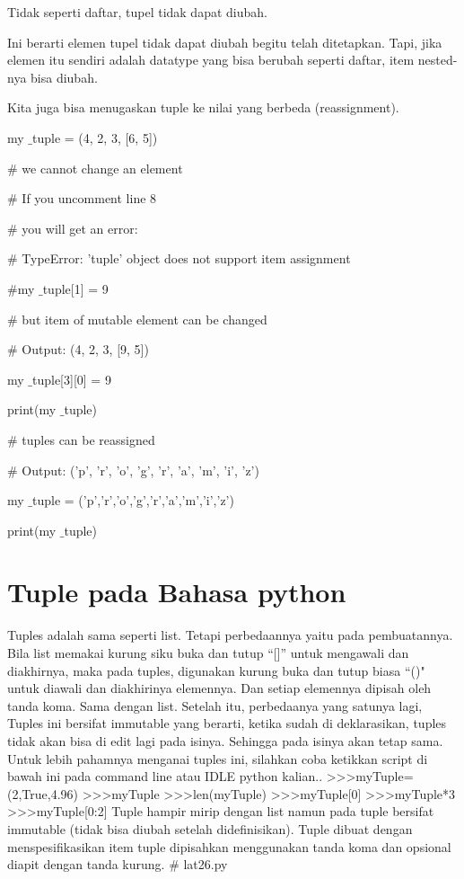 Tidak seperti daftar, tupel tidak dapat diubah. \par
\vspace{12pt}
Ini berarti elemen tupel tidak dapat diubah begitu telah ditetapkan. Tapi, jika elemen itu sendiri adalah datatype yang bisa berubah seperti daftar, item nested-nya bisa diubah. \par
\vspace{12pt}
Kita juga bisa menugaskan tuple ke nilai yang berbeda (reassignment). \par
\vspace{12pt}
my $  \_  $tuple = (4, 2, 3, [6, 5]) \par
\vspace{12pt}
 $  \#  $ we cannot change an element \par
 $  \#  $ If you uncomment line 8 \par
 $  \#  $ you will get an error: \par
 $  \#  $ TypeError: 'tuple' object does not support item assignment \par
\vspace{12pt}
 $  \#  $my $  \_  $tuple[1] = 9 \par
\vspace{12pt}
 $  \#  $ but item of mutable element can be changed \par
 $  \#  $ Output: (4, 2, 3, [9, 5]) \par
my $  \_  $tuple[3][0] = 9 \par
print(my $  \_  $tuple) \par
\vspace{12pt}
 $  \#  $ tuples can be reassigned \par
 $  \#  $ Output: ('p', 'r', 'o', 'g', 'r', 'a', 'm', 'i', 'z') \par
my $  \_  $tuple = ('p','r','o','g','r','a','m','i','z') \par
print(my $  \_  $tuple) \par
\section {Tuple pada Bahasa python}

Tuples adalah sama seperti list. Tetapi perbedaannya yaitu pada pembuatannya. Bila list memakai kurung siku buka dan tutup “[]” untuk mengawali dan diakhirnya, maka pada tuples, digunakan kurung buka dan tutup biasa “()" untuk diawali dan diakhirinya elemennya. Dan setiap elemennya dipisah oleh tanda koma. Sama dengan list. Setelah itu, perbedaanya yang satunya lagi, Tuples ini bersifat immutable yang berarti, ketika sudah di deklarasikan, tuples tidak akan bisa di edit lagi pada isinya. Sehingga pada isinya akan tetap sama. Untuk lebih pahamnya menganai tuples ini, silahkan coba ketikkan script di bawah ini pada command line atau IDLE python kalian..
>>>myTuple=(2,True,4.96) 
>>>myTuple 
>>>len(myTuple) 
>>>myTuple[0] 
>>>myTuple*3
 >>>myTuple[0:2]
Tuple hampir mirip dengan list namun pada tuple bersifat immutable (tidak bisa diubah setelah didefinisikan).
Tuple dibuat dengan menspesifikasikan item tuple dipisahkan menggunakan tanda koma dan opsional diapit dengan tanda kurung.
\# lat26.py

